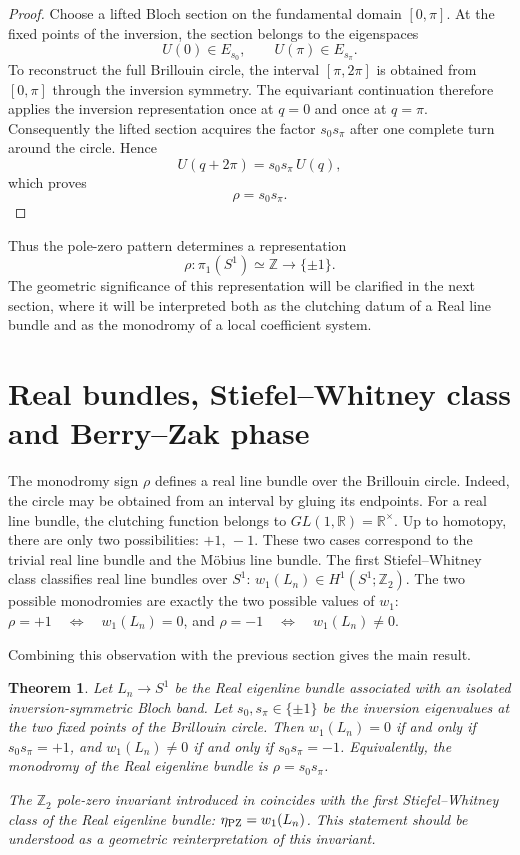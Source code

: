 \documentclass[preprint,12pt]{elsarticle}
\newtheorem{thm}{Theorem}
\newtheorem{proof}{Proof}
\begin{document}
\begin{proof}
Choose a lifted Bloch section on the fundamental domain
$[0,\pi]$. At the fixed points of the inversion, the section belongs to the eigenspaces
$$
U(0)\in E_{s_0},
\qquad
U(\pi)\in E_{s_\pi}.
$$
To reconstruct the full Brillouin circle, the interval $[\pi,2\pi]$ is obtained from $[0,\pi]$
through the inversion symmetry. The equivariant continuation therefore applies
the inversion representation once at $q=0$ and once at $q=\pi$. Consequently the lifted section acquires the factor
$s_0s_\pi$ after one complete turn around the circle. Hence
$$
U(q+2\pi)=s_0s_\pi\,U(q),
$$
which proves
$$
\rho=s_0s_\pi .
$$
\end{proof}
Thus the pole-zero pattern determines a representation
$$
\rho:\pi_1(S^1)\simeq \mathbb Z \to \{\pm1\}.
$$
The geometric significance of this representation will be clarified in the next section, where it will be interpreted both as the clutching datum of a Real line bundle and as the monodromy of a local coefficient system.

\section{Real bundles, Stiefel--Whitney class and Berry--Zak phase}

The monodromy sign $\rho$ defines a real line bundle over the Brillouin circle. Indeed, the circle may be obtained from an interval by gluing its endpoints. For a real line bundle, the clutching function belongs to $GL(1,\mathbb R)=\mathbb R^\times$.
Up to homotopy, there are only two possibilities: $+1,\, -1$.
These two cases correspond to the trivial real line bundle and the M\"obius line bundle. The first Stiefel--Whitney class classifies real line bundles over $S^1$: $w_1(L_n)\in H^1(S^1;\mathbb Z_2)$.
The two possible monodromies are exactly the two possible values of $w_1$: $\rho=+1\quad\Longleftrightarrow\quad w_1(L_n)=0$,
and $\rho=-1 \quad\Longleftrightarrow\quad w_1(L_n)\neq0$.

Combining this observation with the previous section gives the main result.

\begin{thm}\label{thm1}
Let $L_n\to S^1$ be the Real eigenline bundle associated with an isolated inversion-symmetric Bloch band. Let $s_0,s_\pi\in \{\pm1\}$
be the inversion eigenvalues at the two fixed points of the Brillouin circle. Then $w_1(L_n)=0$ if and only if $s_0s_\pi=+1$, and $w_1(L_n)\neq0$ if and only if $s_0s_\pi=-1$.
Equivalently, the monodromy of the Real eigenline bundle is $\rho=s_0s_\pi$.

The $\mathbb Z_2$ pole-zero invariant introduced in \cite{FelbacqAnnalen} coincides with the first Stiefel--Whitney class of the Real eigenline bundle: $\eta_{\rm PZ}=w_1(L_n)$.
This statement should be understood as a geometric reinterpretation of this invariant.
\end{thm}
\end{document}
